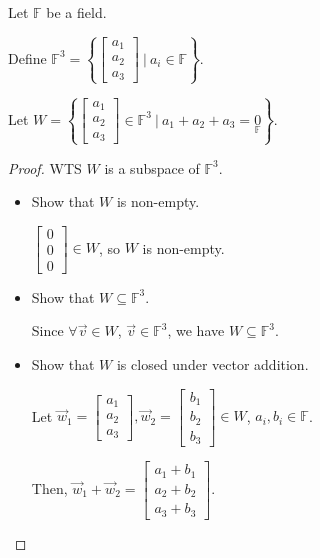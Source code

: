 \documentclass[11pt,fleqn]{book} %
\begin{document}
\begin{example}
    Let $\mathbb{F}$ be a field. 
    
    Define $\mathbb{F}^3 = \left\{ \begin{bmatrix} a_1\\a_2\\a_3 \end{bmatrix} ~|~ a_i \in \mathbb{F} \right\}$. 
    
    Let $W = \left\{ \begin{bmatrix}a_1\\a_2\\a_3\end{bmatrix} \in \mathbb{F}^3 ~|~ a_1+a_2+a_3=\underset{\mathbb{F}}{0} \right\}$. 
    
    \begin{proof}
        WTS $W$ is a subspace of $\mathbb{F}^3$. 
        
        \begin{itemize}
            \item Show that $W$ is non-empty. 

            $\begin{bmatrix} 0\\0\\0 \end{bmatrix} \in W$, so $W$ is non-empty. 

            \item Show that $W \subseteq \mathbb{F}^3$. 
            
            Since $\forall \vec{v} \in W$, $\vec{v} \in \mathbb{F}^3$, we have $W \subseteq \mathbb{F}^3$. 
            
            \item Show that $W$ is closed under vector addition. 

            Let $\vec{w}_1 = \begin{bmatrix}a_1\\a_2\\a_3\end{bmatrix}, \vec{w}_2 = \begin{bmatrix}b_1\\b_2\\b_3\end{bmatrix} \in W$, $a_i,b_i \in \mathbb{F}$. 
            
            Then, $\vec{w}_1 + \vec{w}_2 = \begin{bmatrix}a_1+b_1\\a_2+b_2\\a_3+b_3\end{bmatrix}$. 
            

\end{itemize}
\end{proof}
\end{example}
\end{document}

